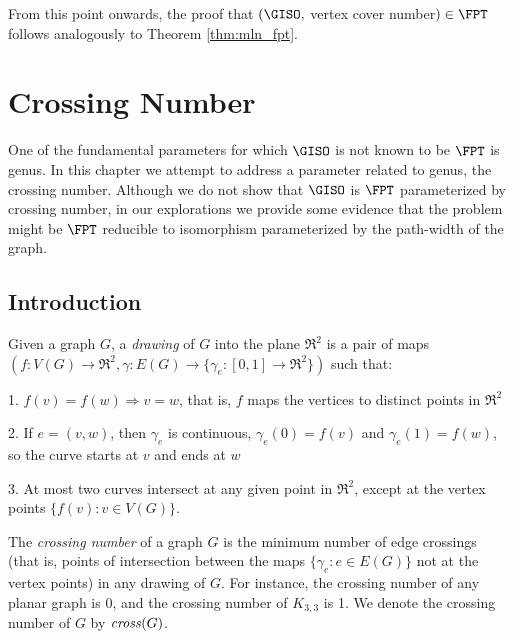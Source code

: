 \documentclass[11pt]{report}
\newcommand{\cross}{\mbox{\emph{cross}}}
\begin{document}
From this point onwards, the proof that $(\GISO, $ vertex cover number$)\in\FPT$ follows analogously to Theorem \ref{thm:mln_fpt}.



















\chapter{Crossing Number}

One of the fundamental parameters for which $\GISO$ is not known to be $\FPT$ is genus. In this chapter we attempt to address a parameter related to genus, the crossing number. Although we do not show that $\GISO$ is $\FPT$ parameterized by crossing number, in our explorations we provide some evidence that the problem might be $\FPT$ reducible to isomorphism parameterized by the path-width of the graph.

\section{Introduction}



Given a graph $G$, a \emph{drawing} of $G$ into the plane $\Re ^2$ is a pair of maps $ (f: V(G) \rightarrow \Re ^{2}, \gamma : E(G) \rightarrow \{ \gamma _{e}:[0,1] \rightarrow \Re ^{2} \} ) $ such that:

1. $f(v)=f(w) \Rightarrow v=w$, that is, $f$ maps the vertices to distinct points in $\Re ^2$

2. If $e=(v,w)$, then $\gamma_e$ is continuous, $\gamma _{e}(0) = f(v)$ and $\gamma _{e}(1) = f(w)$, so the curve starts at $v$ and ends at $w$

3. At most two curves intersect at any given point in $\Re ^2$, except at the vertex points $\{f(v):v\in V(G)\}$.


The \emph{crossing number} of a graph $G$ is the minimum number of edge crossings (that is, points of intersection between the maps $\{ \gamma _{e}: e \in E(G) \}$  not at the vertex points) in any drawing of $G$. For instance, the crossing number of any planar graph is 0, and the crossing number of $K_{3,3}$ is 1. We denote the crossing number of $G$ by $\cross (G)$.
\end{document}

